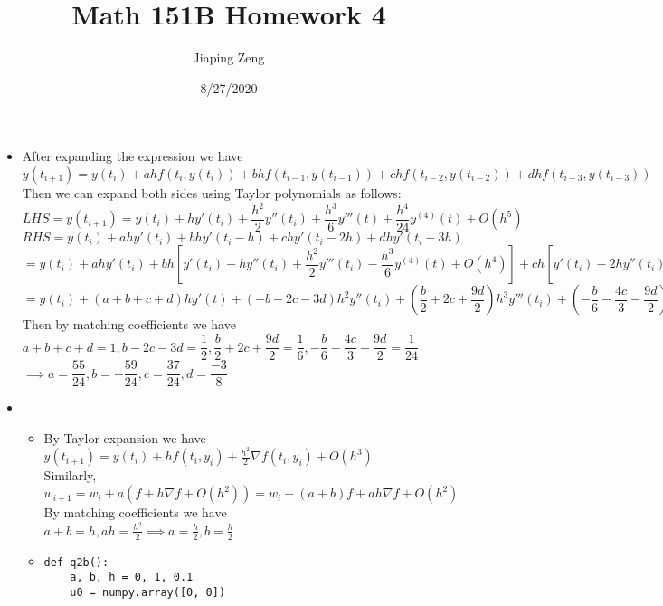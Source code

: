\documentclass{article}
\title{Math 151B Homework 4}
\date{8/27/2020}
\author{Jiaping Zeng}
\begin{document}
\maketitle

\begin{itemize}
    \item [Q1] After expanding the expression we have\\$y(t_{i+1})=y(t_i)+ahf(t_i,y(t_i))+bhf(t_{i-1},y(t_{i-1}))+chf(t_{i-2},y(t_{i-2}))+dhf(t_{i-3},y(t_{i-3}))$\\Then we can expand both sides using Taylor polynomials as follows:\\$LHS=y(t_{i+1})=y(t_i)+hy'(t_i)+\dfrac{h^2}{2}y''(t_i)+\dfrac{h^3}{6}y'''(t)+\dfrac{h^4}{24}y^{(4)}(t)+O(h^5)$\\
          $RHS=y(t_i)+ahy'(t_i)+bhy'(t_i-h)+chy'(t_i-2h)+dhy'(t_i-3h)$\\
          $=y(t_i)+ahy'(t_i)+bh[y'(t_i)-hy''(t_i)+\dfrac{h^2}{2}y'''(t_i)-\dfrac{h^3}{6}y^{(4)}(t)+O(h^4)]+ch[y'(t_i)-2hy''(t_i)+2h^2y'''(t_i)-\dfrac{4h^3}{3}y^{(4)}(t)+O(h^4)]+dh[y'(t_i)-3hy''(t_i)+\dfrac{9h^2}{2}y'''(t_i)-\dfrac{9h^3}{2}y^{(4)}(t)+O(h^4)]$\\
          $=y(t_i)+(a+b+c+d)hy'(t)+(-b-2c-3d)h^2y''(t_i)+(\dfrac{b}{2}+2c+\dfrac{9d}{2})h^3y'''(t_i)+(-\dfrac{b}{6}-\dfrac{4c}{3}-\dfrac{9d}{2})h^4y^{(4)}(t_i)+O(h^5)$\\
          Then by matching coefficients we have\\$a+b+c+d=1,b-2c-3d=\dfrac{1}{2},\dfrac{b}{2}+2c+\dfrac{9d}{2}=\dfrac{1}{6},-\dfrac{b}{6}-\dfrac{4c}{3}-\dfrac{9d}{2}=\dfrac{1}{24}$\\$\implies\boxed{a=\dfrac{55}{24},b=-\dfrac{59}{24},c=\dfrac{37}{24},d=\dfrac{-3}{8}}$
    \item [Q2] \begin{itemize}
              \item [(a)] By Taylor expansion we have\\
                    $y(t_{i+1})=y(t_i)+hf(t_i,y_i)+\frac{h^2}{2}\nabla f(t_i,y_i)+O(h^3)$\\Similarly,\\
                    $w_{i+1}=w_i+a(f+h\nabla f+O(h^2))=w_i+(a+b)f+ah\nabla f+O(h^2)$\\By matching coefficients we have\\$a+b=h, ah=\frac{h^2}{2}\implies\boxed{a=\frac{h}{2},b=\frac{h}{2}}$
              \item [(b)] \begin{verbatim}
def q2b():
    a, b, h = 0, 1, 0.1
    u0 = numpy.array([0, 0])


\end{verbatim}
\end{itemize}
\end{itemize}
\end{document}
